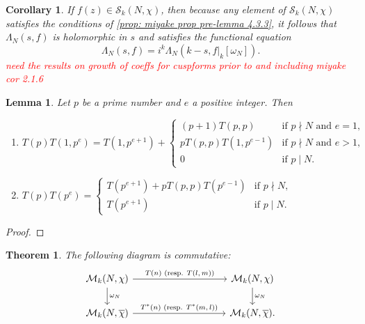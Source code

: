 \documentclass[10pt,leqno,twoside]{article}
\theoremstyle{plain}
\newtheorem{lemma}[lem]{Lemma}
\newtheorem{theorem}[lem]{Theorem}
\newtheorem{corollary}[lem]{Corollary}
\theoremstyle{definition}
\numberwithin{equation}{section}
\numberwithin{lem}{section}
\newcommand{\textib}[1]{\textbf{\textit{#1\index{#1}}}} %
\newcommand{\tbd}{{\Huge\color{red}{\textib{TBD}}}}
\newcommand{\sai}[1]{\textcolor{red}{#1}}
\begin{document}
\begin{corollary}\label{cor: miyake cor 4.3.7}
    If $f(z)\in \mathcal S_k(N,\chi)$, then because any element of $\mathcal S_k(N,\chi)$ satisfies the conditions of \cref{prop: miyake prop pre-lemma 4.3.3}, it follows that $\varLambda_N(s,f)$ is holomorphic in $s$ and satisfies the functional equation
    \[\varLambda_N(s,f) = i^k\varLambda_N(k-s,f|_k[\omega_N]).\]\sai{need the results on growth of coeffs for cuspforms prior to and including miyake cor 2.1.6}
\end{corollary}
\begin{lemma}\label{lem: miyake lem 4.5.7}
    Let $p$ be a prime number and $e$ a positive integer. Then \begin{enumerate}[label=\textup{(\arabic*)}]
        \item $T(p)T(1,p^e) = T(1,p^{e+1}) + \begin{cases}
            (p+1)T(p,p) & \text{if $p\nmid N$ and $e=1$,}\\
            pT(p,p)T(1,p^{e-1}) & \text{if $p\nmid N$ and $e > 1$,}\\
            0 & \text{if $p\mid N$.}
        \end{cases}$
        \item $T(p)T(p^e) = \begin{cases}
            T(p^{e+1})+pT(p,p)T(p^{e-1}) & \text{if $p\nmid N$,}\\
            T(p^{e+1}) & \text{if $p\mid N$.}
        \end{cases}$
    \end{enumerate}
\end{lemma}
\begin{proof}
    \tbd
\end{proof}
\begin{theorem}\label{thm: miyake thm 4.5.5}
    The following diagram is commutative: 
\[\begin{tikzcd}
	{\mathcal M_k(N,\chi)} &&&& {\mathcal M_k(N,\chi)} \\
	{\mathcal M_k(N,\overline{\chi})} &&&& {\mathcal M_k(N,\overline{\chi}).}
	\arrow["{\omega_N}", from=1-1, to=2-1]
	\arrow["{T^\ast(n)\text{ \textup{(}resp. $T^\ast(m,l)$\textup{)}}}", from=2-1, to=2-5]
	\arrow["{T(n)\text{ \textup{(}resp. $T(l,m)$\textup{)}}}", from=1-1, to=1-5]
	\arrow["{\omega_N}", from=1-5, to=2-5]
\end{tikzcd}\]
\end{theorem}
\end{document}
